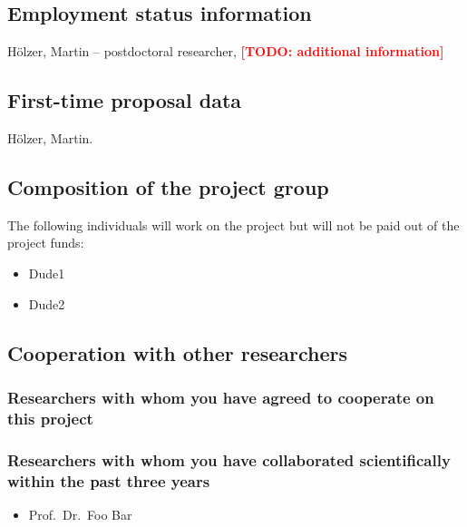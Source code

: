 \documentclass{scrartcl}
\newcommand{\todo}[1]{\xspace{\textcolor{red}{\bfseries[TODO: #1]}}\xspace}
\begin{document}
\subsection{Employment status information}
H\"olzer, Martin -- postdoctoral researcher, \todo{additional information}

\subsection{First-time proposal data}
H\"olzer, Martin.

\subsection{Composition of the project group}
The following individuals will work on the project but will not be paid out of
the project funds:

\begin{itemize}
\item Dude1
\item Dude2
\end{itemize}

\subsection{Cooperation with other researchers}

\subsubsection{Researchers with whom you have agreed to cooperate on this project}

\subsubsection{Researchers with whom you have collaborated scientifically within the past three years}
\begin{itemize}
  \item Prof.\ Dr.\ Foo Bar
\end{itemize}
\end{document}
